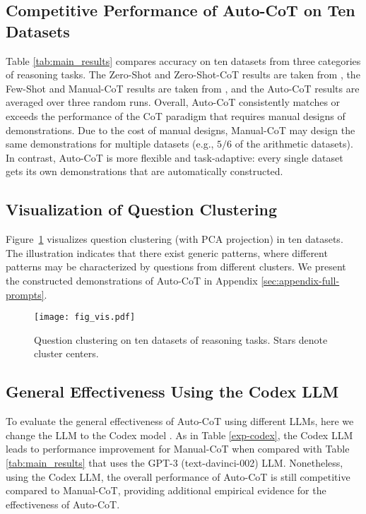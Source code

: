 \subsection{Competitive Performance of Auto-CoT on Ten Datasets}

Table \ref{tab:main_results} compares accuracy on ten datasets from three categories of reasoning tasks.
The Zero-Shot and Zero-Shot-CoT results are taken from \citet{kojima2022large}, the Few-Shot and Manual-CoT results are taken from \citet{cot_wei}, and the Auto-CoT results are averaged over three random runs.
Overall, Auto-CoT consistently matches or exceeds the performance of the CoT paradigm that requires manual designs of demonstrations. 
Due to the cost of manual designs, Manual-CoT may design the same demonstrations for multiple datasets (e.g., $5/6$ of the arithmetic datasets). In contrast, Auto-CoT is more flexible and task-adaptive: every single dataset gets its own demonstrations that are automatically constructed.

\subsection{Visualization of Question Clustering}\label{appendix:vis}

Figure~\ref{fig:vis} visualizes question clustering (with PCA projection) in ten datasets. The illustration indicates that there exist generic patterns, where different patterns may be characterized by questions from different clusters. We present the constructed demonstrations of Auto-CoT in Appendix \ref{sec:appendix-full-prompts}. 

\begin{figure}[htb]
  \begin{center}
  \texttt{[image: fig\_vis.pdf]}
  \end{center}
  \caption{Question clustering on ten datasets of reasoning tasks. Stars denote cluster centers.}
  \label{fig:vis}
\end{figure}

\subsection{General Effectiveness Using the Codex LLM}

To evaluate the general effectiveness of Auto-CoT using different LLMs, here we change the LLM to the Codex model \citep{chen2021evaluating}.
As in Table \ref{exp-codex}, the Codex LLM leads to performance improvement for Manual-CoT when compared with 
Table \ref{tab:main_results} that uses the GPT-3 (text-davinci-002) LLM. 
Nonetheless, using the Codex LLM, the overall performance of Auto-CoT is still competitive compared to Manual-CoT, providing additional empirical evidence for the effectiveness of Auto-CoT.

